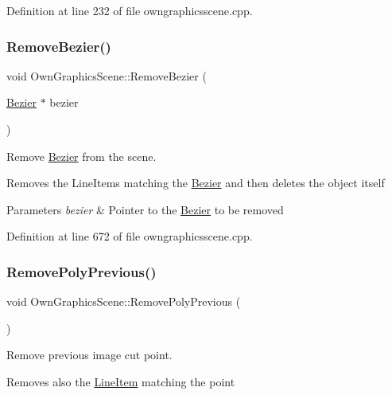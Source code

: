 Definition at line 232 of file owngraphicsscene.\+cpp.

\mbox{\label{classOwnGraphicsScene_a24d8270608b0bd56c6155d99d7722ab8}} 
\subsubsection{\texorpdfstring{Remove\+Bezier()}{RemoveBezier()}}
{\footnotesize\ttfamily void Own\+Graphics\+Scene\+::\+Remove\+Bezier (\begin{DoxyParamCaption}\item[{\mbox{\hyperlink{classBezier}{Bezier}} $\ast$}]{bezier }\end{DoxyParamCaption})}



Remove \mbox{\hyperlink{classBezier}{Bezier}} from the scene. 

Removes the Line\+Items matching the \mbox{\hyperlink{classBezier}{Bezier}} and then deletes the object itself 
\begin{DoxyParams}{Parameters}
{\em bezier} & Pointer to the \mbox{\hyperlink{classBezier}{Bezier}} to be removed \\
\hline
\end{DoxyParams}


Definition at line 672 of file owngraphicsscene.\+cpp.

\mbox{\label{classOwnGraphicsScene_a4976a8e6f682612acd3e23b6c98bd8d8}} 
\subsubsection{\texorpdfstring{Remove\+Poly\+Previous()}{RemovePolyPrevious()}}
{\footnotesize\ttfamily void Own\+Graphics\+Scene\+::\+Remove\+Poly\+Previous (\begin{DoxyParamCaption}{ }\end{DoxyParamCaption})}



Remove previous image cut point. 

Removes also the \mbox{\hyperlink{classLineItem}{Line\+Item}} matching the point 

